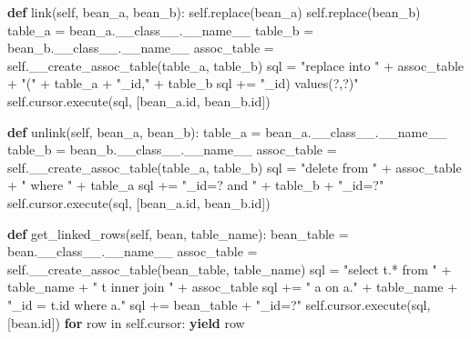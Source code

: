 \documentclass[]{article}
\newenvironment{Shaded}{}{}
\newcommand{\KeywordTok}[1]{\textcolor[rgb]{0.00,0.44,0.13}{\textbf{{#1}}}}
\newcommand{\DataTypeTok}[1]{\textcolor[rgb]{0.56,0.13,0.00}{{#1}}}
\newcommand{\StringTok}[1]{\textcolor[rgb]{0.25,0.44,0.63}{{#1}}}
\newcommand{\OtherTok}[1]{\textcolor[rgb]{0.00,0.44,0.13}{{#1}}}
\newcommand{\NormalTok}[1]{{#1}}
\begin{document}
\begin{Shaded}
\begin{Highlighting}[]
    \KeywordTok{def} \NormalTok{link(}\OtherTok{self}\NormalTok{, bean_a, bean_b):}
        \OtherTok{self}\NormalTok{.replace(bean_a)}
        \OtherTok{self}\NormalTok{.replace(bean_b)}
        \NormalTok{table_a = bean_a.__class__.}\OtherTok{__name__}
        \NormalTok{table_b = bean_b.__class__.}\OtherTok{__name__}
        \NormalTok{assoc_table = }\OtherTok{self}\NormalTok{.__create_assoc_table(table_a, table_b)}
        \NormalTok{sql = }\StringTok{"replace into "} \NormalTok{+ assoc_table + }\StringTok{"("} \NormalTok{+ table_a + }\StringTok{"_id,"} \NormalTok{+ table_b}
        \NormalTok{sql += }\StringTok{"_id) values(?,?)"}
        \OtherTok{self}\NormalTok{.cursor.execute(sql,}
                \NormalTok{[bean_a.}\DataTypeTok{id}\NormalTok{, bean_b.}\DataTypeTok{id}\NormalTok{])}
    
    \KeywordTok{def} \NormalTok{unlink(}\OtherTok{self}\NormalTok{, bean_a, bean_b):}
        \NormalTok{table_a = bean_a.__class__.}\OtherTok{__name__}
        \NormalTok{table_b = bean_b.__class__.}\OtherTok{__name__}
        \NormalTok{assoc_table = }\OtherTok{self}\NormalTok{.__create_assoc_table(table_a, table_b)}
        \NormalTok{sql = }\StringTok{"delete from "} \NormalTok{+ assoc_table + }\StringTok{" where "} \NormalTok{+ table_a}
        \NormalTok{sql += }\StringTok{"_id=? and "} \NormalTok{+ table_b + }\StringTok{"_id=?"}
        \OtherTok{self}\NormalTok{.cursor.execute(sql,}
                \NormalTok{[bean_a.}\DataTypeTok{id}\NormalTok{, bean_b.}\DataTypeTok{id}\NormalTok{])}
    
    \KeywordTok{def} \NormalTok{get_linked_rows(}\OtherTok{self}\NormalTok{, bean, table_name):}
        \NormalTok{bean_table = bean.__class__.}\OtherTok{__name__}
        \NormalTok{assoc_table = }\OtherTok{self}\NormalTok{.__create_assoc_table(bean_table, table_name)}
        \NormalTok{sql = }\StringTok{"select t.* from "} \NormalTok{+ table_name + }\StringTok{" t inner join "} \NormalTok{+ assoc_table }
        \NormalTok{sql += }\StringTok{" a on a."} \NormalTok{+ table_name + }\StringTok{"_id = t.id where a."}
        \NormalTok{sql += bean_table + }\StringTok{"_id=?"}
        \OtherTok{self}\NormalTok{.cursor.execute(sql,[bean.}\DataTypeTok{id}\NormalTok{])}
        \KeywordTok{for} \NormalTok{row in }\OtherTok{self}\NormalTok{.cursor:}
            \KeywordTok{yield} \NormalTok{row}


\end{Highlighting}
\end{Shaded}
\end{document}
